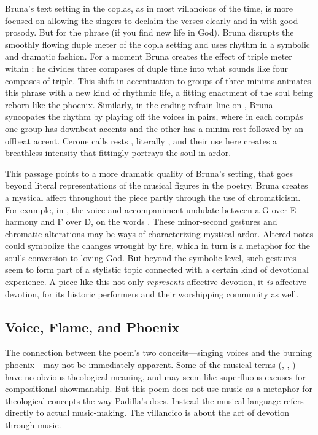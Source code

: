 Bruna's text setting in the coplas, as in most villancicos of the time, is more focused on allowing the singers to declaim the verses clearly and in with good prosody.
But for the phrase  (if you find new life in God), Bruna disrupts the smoothly flowing duple meter of the copla setting and uses rhythm in a symbolic and dramatic fashion.
For a moment Bruna creates the effect of triple meter within : he divides three compases of duple time into what sounds like four compases of triple.
This shift in accentuation to groups of three minims animates this phrase with a new kind of rhythmic life, a fitting enactment of the soul being reborn like the phoenix.
Similarly, in the ending refrain line on , Bruna syncopates the rhythm by playing off the voices in pairs, where in each compás one group has downbeat accents and the other has a minim rest followed by an offbeat accent.
Cerone calls rests , literally , and their use here creates a breathless intensity that fittingly portrays the soul in ardor.

This passage points to a more dramatic quality of Bruna's setting, that goes beyond literal representations of the musical figures in the poetry.
Bruna creates a mystical affect throughout the piece partly through the use of chromaticism.
For example, in , the voice and accompaniment undulate between a G-over-E\fl{} harmony and F\sh{} over D, on the words .
These minor-second gestures and chromatic alterations may be ways of characterizing mystical ardor.
Altered notes could symbolize the changes wrought by fire, which in turn is a metaphor for the soul's conversion to loving God.
But beyond the symbolic level, such gestures seem to form part of a stylistic topic connected with a certain kind of devotional experience.
A piece like this not only \emph{represents} affective devotion, it \emph{is} affective devotion, for its historic performers and their worshipping community as well.

\subsection{Voice, Flame, and Phoenix}

The connection between the poem's two conceits---singing voices and the burning phoenix---may not be immediately apparent.
Some of the musical terms (, , ) have no obvious theological meaning, and may seem like superfluous excuses for compositional showmanship.
But this poem does not use music as a metaphor for theological concepts the way Padilla's  does.
Instead the musical language refers directly to actual music-making.
The villancico is about the act of devotion through music.

